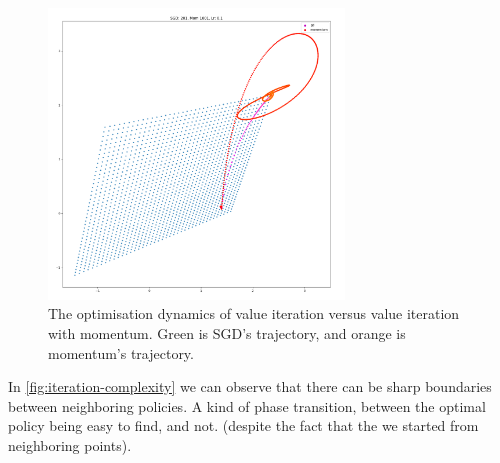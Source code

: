 \begin{figure}[h!]
\centering
\includegraphics[width=0.7\textwidth,height=0.35\textheight]{../../pictures/figures/vi_sgd-vs-vi_mom_01.png}
\caption{The optimisation dynamics of value iteration versus value iteration with momentum.
Green is SGD's trajectory, and orange is momentum's trajectory.}
\label{mom-compare-sgd}
\end{figure}

\newpage
In \ref{fig:iteration-complexity} we can observe that there can be sharp boundaries
between neighboring policies. A kind of phase transition, between the optimal policy being easy to find, and not.
(despite the fact that the we started from neighboring points).

